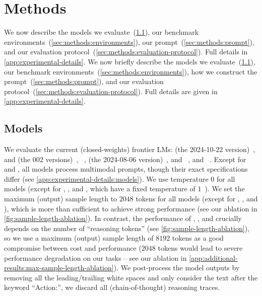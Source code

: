 \section{Methods}
\label{sec:methods}

\ificlr
We now describe the models we evaluate~(\cref{sec:methods:models}), our benchmark environments~(\cref{sec:methods:environments}), our prompt~(\cref{sec:methods:prompt}), and our evaluation protocol~(\cref{sec:methods:evaluation-protocol}).
Full details in \cref{app:experimental-details}.
\else
We now briefly describe the models we evaluate~(\cref{sec:methods:models}), our benchmark environments~(\cref{sec:methods:environments}), how we construct the prompt~(\cref{sec:methods:prompt}), and our evaluation protocol~(\cref{sec:methods:evaluation-protocol}).
Full details are given in \cref{app:experimental-details}.
\fi


\subsection{Models}
\label{sec:methods:models}

We evaluate the current (closed-weights) frontier LMs:
\claude{} (the 2024-10-22 version)~\citep{anthropic2024claude3.5, anthropic2024introducing},
\flash{} and \pro{} (the $002$ versions)~\citep{reid2024gemini},
\expflash{}~\citep{google2024introducing},
\gpt{} (the 2024-08-06 version)~\citep{openai2024gpt4o,openai2024gpt4ocard},
\mini{} and \preview{}~\citep{openai2024o1}, and 
\oone{}~\citep{openai2024o1card}.
Except for \mini{} and \preview{}, all models process multimodal prompts, though their exact specifications differ (see \cref{app:experimental-details:models}).
We use temperature $0$ for all models (except for \mini{}, \preview{}, and \oone{}, which have a fixed temperature of $1$~\citep{openai2024reasoning}).
We set the maximum (output) sample length to $2048$ tokens for all models (except for \mini{}, \preview{}, and \oone{}), which is more than sufficient to achieve strong performance (see our ablation in \cref{fig:sample-length-ablation}).
In contrast, the performance of \mini{}, \preview{}, and \oone{} crucially depends on the number of ``reasoning tokens'' (see \cref{fig:sample-length-ablation}), so we use a maximum (output) sample length of $8192$ tokens as a good compromise between cost and performance ($2048$ tokens would lead to severe performance degradation on our tasks -- see our ablation in \cref{app:additional-results:max-sample-length-ablation}).
We post-process the model outputs by removing all the leading/trailing white spaces and only consider the text after the keyword ``Action:'', \ie we discard all (chain-of-thought) reasoning traces.


